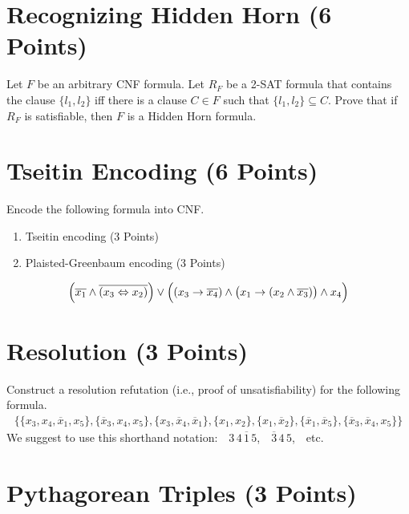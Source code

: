 \documentclass[a4paper]{article}
\begin{document}


\section{Recognizing Hidden Horn (6 Points)}

Let $F$ be an arbitrary CNF formula.
Let $R_F$ be a 2-SAT formula that contains the clause $\{l_1, l_2\}$ iff there is a clause $C \in F$ such that $\{l_1,l_2\} \subseteq C$.
Prove that if $R_F$ is satisfiable, then $F$ is a Hidden Horn formula.

\section{Tseitin Encoding (6 Points)}

Encode the following formula into CNF.
\begin{enumerate}[label=\alph*)]
\item Tseitin encoding (3 Points)
\item Plaisted-Greenbaum encoding (3 Points)
\end{enumerate}
\begin{align*}
\Bigl(\overline{x_1} \wedge \overline{(x_3 \Leftrightarrow x_2)}\Bigr) \vee \Bigl((x_3 \rightarrow \overline{x_4}) \wedge \bigl(x_1 \rightarrow (x_2 \wedge \overline{x_3})\bigr) \wedge x_4\Bigr)
\end{align*}


\section{Resolution (3 Points)}

Construct a resolution refutation (i.e., proof of unsatisfiability) for the following formula.
\vspace*{-1ex}
\begin{align*}
	\bigl\{
	\{x_{3}, x_{4}, \overline x_{1}, x_{5} \}, 
	\{\overline x_{3}, x_{4}, x_{5} \}, 
	\{x_{3}, \overline x_{4}, \overline x_{1} \}, 
	\{x_{1}, x_{2} \}, 
	\{x_{1}, \overline x_{2} \},  
	\{\overline x_{1}, \overline x_{5} \}, 
	\{\overline x_{3}, \overline x_{4}, x_{5}\}
	\bigr\}
\end{align*}
%
We suggest to use this shorthand notation:~~$3\,4\,\overline{1}\,5$,~~$\overline{3}\,4\,5$,~~etc.


\section{Pythagorean Triples (3 Points)}
\end{document}
